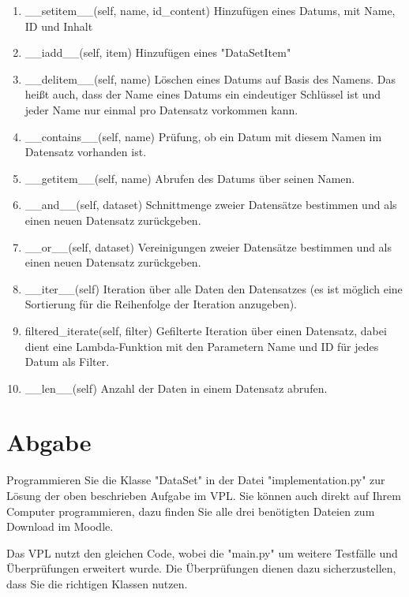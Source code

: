 \documentclass[
    oneside, %
    12pt, %
    a4paper, %
    parskip=full %
]{scrartcl}
\begin{document}
\begin{enumerate}
    \item \_\_setitem\_\_(self, name, id\_content)
        Hinzufügen eines Datums, mit Name, ID und Inhalt
    \item \_\_iadd\_\_(self, item) Hinzufügen eines "DataSetItem"
    \item \_\_delitem\_\_(self, name) Löschen eines Datums auf Basis des Namens.
        Das heißt auch, dass der Name eines Datums ein eindeutiger Schlüssel ist und jeder Name nur einmal pro Datensatz vorkommen kann.
    \item \_\_contains\_\_(self, name) Prüfung, ob ein Datum mit diesem Namen im Datensatz vorhanden ist.
    \item \_\_getitem\_\_(self, name) Abrufen des Datums über seinen Namen.
    \item \_\_and\_\_(self, dataset) Schnittmenge zweier Datensätze bestimmen und als einen neuen Datensatz zurückgeben.
    \item \_\_or\_\_(self, dataset) Vereinigungen zweier Datensätze bestimmen und als einen neuen Datensatz zurückgeben.
    \item \_\_iter\_\_(self) Iteration über alle Daten den Datensatzes (es ist möglich eine Sortierung für die Reihenfolge der Iteration anzugeben).
    \item filtered\_iterate(self, filter) Gefilterte Iteration über einen Datensatz, dabei dient eine Lambda-Funktion mit den Parametern Name und ID für jedes Datum als Filter.
    \item \_\_len\_\_(self) Anzahl der Daten in einem Datensatz abrufen.
\end{enumerate}



\section{Abgabe}

Programmieren Sie die Klasse "DataSet" in der Datei "implementation.py" zur Lösung der oben beschrieben Aufgabe im VPL.
Sie können auch direkt auf Ihrem Computer programmieren, dazu finden Sie alle drei benötigten Dateien zum Download im Moodle.

Das VPL nutzt den gleichen Code, wobei die "main.py" um weitere Testfälle und Überprüfungen erweitert wurde.
Die Überprüfungen dienen dazu sicherzustellen, dass Sie die richtigen Klassen nutzen.\\
%
\end{document}
